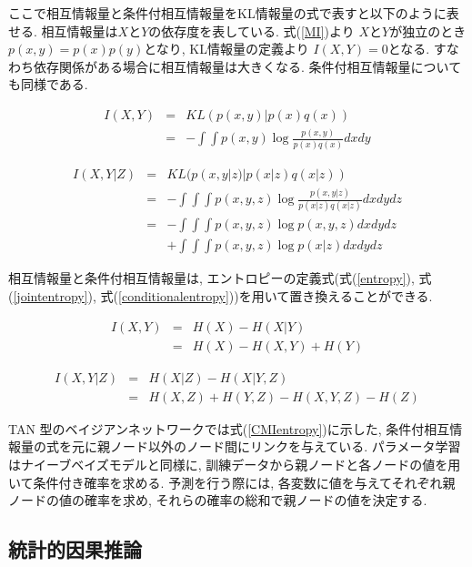 \documentclass[a4paper]{jarticle}
\begin{document}
ここで相互情報量と条件付相互情報量をKL情報量の式で表すと以下のように表せる. 相互情報量は$X$と$Y$の依存度を表している. 式(\ref{MI})より $X$と$Y$が独立のとき$p(x, y) = p(x) p(y)$となり, KL情報量の定義より $I(X, Y) = 0$となる. すなわち依存関係がある場合に相互情報量は大きくなる. 条件付相互情報量についても同様である. 

\begin{eqnarray}
\label{MI}
I(X, Y) &=& KL(p(x, y) | p(x) q(x)) \nonumber \\
          &=& - \int \int p(x, y) \log \frac{p(x, y)}{p(x) q(x)} dx dy 
\end{eqnarray}

\begin{eqnarray}
\label{CMI}
I(X, Y | Z) &=&  KL(p(x, y| z) | p(x|z) q(x|z)) \nonumber \\
              &=& - \int \int \int p(x, y, z) \log \frac{p(x, y|z)}{p(x|z) q(x|z)} dx dy dz \nonumber \\
               &=& - \int \int \int p(x, y, z) \log p(x, y, z) dx dy dz  \nonumber \\
                &&+ \int \int \int p(x, y, z) \log p(x| z) dx dy dz 
\end{eqnarray}

相互情報量と条件付相互情報量は, エントロピーの定義式(式(\ref{entropy}), 式(\ref{jointentropy}), 式(\ref{conditionalentropy}))を用いて置き換えることができる.  

\begin{eqnarray}
\label{MIentropy}
I(X, Y) &=& H(X) - H(X|Y) \nonumber \\
         &=& H(X) - H(X, Y) + H(Y)
\end{eqnarray}

\begin{eqnarray}
\label{CMIentropy}
I(X, Y | Z) &=& H(X| Z) - H(X| Y, Z) \nonumber \\
               &=& H(X, Z) + H(Y, Z) - H(X, Y, Z) - H(Z)
\end{eqnarray}

TAN 型のベイジアンネットワークでは式(\ref{CMIentropy})に示した, 条件付相互情報量の式を元に親ノード以外のノード間にリンクを与えている. パラメータ学習はナイーブベイズモデルと同様に,  訓練データから親ノードと各ノードの値を用いて条件付き確率を求める. 予測を行う際には, 各変数に値を与えてそれぞれ親ノードの値の確率を求め, それらの確率の総和で親ノードの値を決定する.

\subsection{統計的因果推論}
\end{document}
